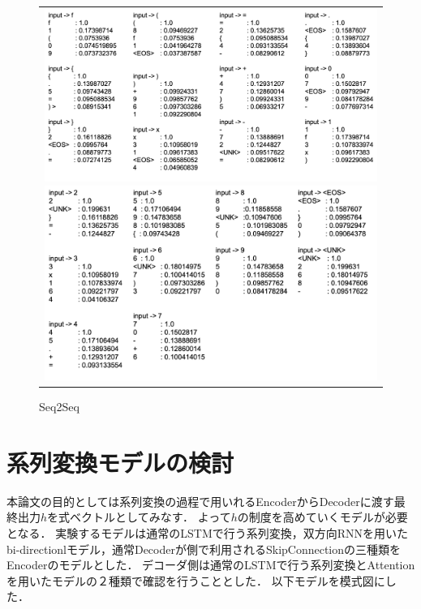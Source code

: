 \documentclass[a4j,11pt,report]{jsbook}
\begin{document}
\begin{figure}[htpb]
  \centering
  \begin{tabular}{c}
    \begin{minipage}{0.47\hsize}
      \centering
      \includegraphics[width=\linewidth]{image/1.png}
    \end{minipage}

    \begin{minipage}{0.06\hsize}
      \hspace{2mm}
    \end{minipage}

    \begin{minipage}{0.47\hsize}
      \centering
      \includegraphics[width=\linewidth]{image/2.png}

    \end{minipage}

  \end{tabular}
  \caption{Seq2Seq}

  \label{fig:textresult}
\end{figure}



\section{系列変換モデルの検討}
本論文の目的としては系列変換の過程で用いれるEncoderからDecoderに渡す最終出力$h$を式ベクトルとしてみなす．
よって$h$の制度を高めていくモデルが必要となる．
実験するモデルは通常のLSTMで行う系列変換，双方向RNNを用いたbi-directionlモデル，通常Decoderが側で利用されるSkipConnectionの三種類をEncoderのモデルとした．
デコーダ側は通常のLSTMで行う系列変換とAttentionを用いたモデルの２種類で確認を行うこととした．
以下モデルを模式図にした．
\end{document}
